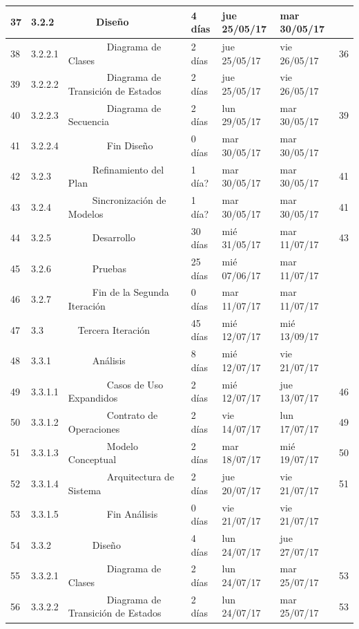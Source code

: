 \begin{center}
\begin{longtable}{  l  l  l  l  l  l  c  }
	37 & 3.2.2 &      Diseño & 4 días & jue 25/05/17 & mar 30/05/17 &  \\ \hline
	38 & 3.2.2.1 &         Diagrama de Clases & 2 días & jue 25/05/17 & vie 26/05/17 & 36 \\ \hline
	39 & 3.2.2.2 &         Diagrama de Transición de Estados & 2 días & jue 25/05/17 & vie 26/05/17 &  \\ \hline
	40 & 3.2.2.3 &         Diagrama de Secuencia & 2 días & lun 29/05/17 & mar 30/05/17 & 39 \\ \hline
	41 & 3.2.2.4 &         Fin Diseño & 0 días & mar 30/05/17 & mar 30/05/17 &  \\ \hline
	42 & 3.2.3 &      Refinamiento del Plan & 1 día? & mar 30/05/17 & mar 30/05/17 & 41 \\ \hline
	43 & 3.2.4 &      Sincronización de Modelos & 1 día? & mar 30/05/17 & mar 30/05/17 & 41 \\ \hline
	44 & 3.2.5 &      Desarrollo & 30 días & mié 31/05/17 & mar 11/07/17 & 43 \\ \hline
	45 & 3.2.6 &      Pruebas & 25 días & mié 07/06/17 & mar 11/07/17 &  \\ \hline
	46 & 3.2.7 &      Fin de la Segunda Iteración & 0 días & mar 11/07/17 & mar 11/07/17 &  \\ \hline
	47 & 3.3 &   Tercera Iteración & 45 días & mié 12/07/17 & mié 13/09/17 &  \\ \hline
	48 & 3.3.1 &      Análisis & 8 días & mié 12/07/17 & vie 21/07/17 &  \\ \hline
	49 & 3.3.1.1 &         Casos de Uso Expandidos & 2 días & mié 12/07/17 & jue 13/07/17 & 46 \\ \hline
	50 & 3.3.1.2 &         Contrato de Operaciones & 2 días & vie 14/07/17 & lun 17/07/17 & 49 \\ \hline
	51 & 3.3.1.3 &         Modelo Conceptual & 2 días & mar 18/07/17 & mié 19/07/17 & 50 \\ \hline
	52 & 3.3.1.4 &         Arquitectura de Sistema & 2 días & jue 20/07/17 & vie 21/07/17 & 51 \\ \hline
	53 & 3.3.1.5 &         Fin Análisis & 0 días & vie 21/07/17 & vie 21/07/17 &  \\ \hline
	54 & 3.3.2 &      Diseño & 4 días & lun 24/07/17 & jue 27/07/17 &  \\ \hline
	55 & 3.3.2.1 &         Diagrama de Clases & 2 días & lun 24/07/17 & mar 25/07/17 & 53 \\ \hline
	56 & 3.3.2.2 &         Diagrama de Transición de Estados & 2 días & lun 24/07/17 & mar 25/07/17 & 53 \\ \hline

\end{longtable}
\end{center}
